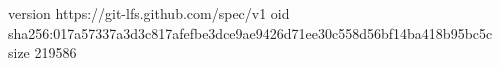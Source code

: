 version https://git-lfs.github.com/spec/v1
oid sha256:017a57337a3d3c817afefbe3dce9ae9426d71ee30c558d56bf14ba418b95bc5c
size 219586
